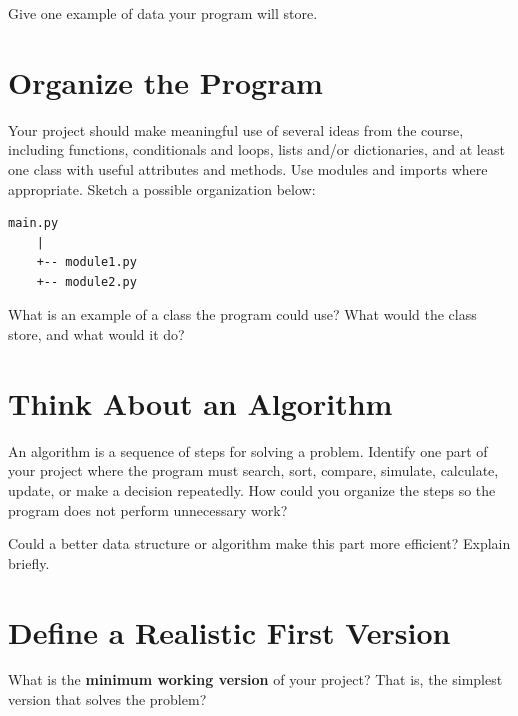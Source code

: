 \documentclass{article}
\begin{document}
Give one example of data your program will store.

\vspace{0.55cm}

\section{Organize the Program}

Your project should make meaningful use of several ideas from the course, including functions, conditionals and loops, lists and/or dictionaries, and at least one class with useful attributes and methods.  Use modules and imports where appropriate.  Sketch a possible organization below: \\ \vspace{1cm}

\begin{verbatim}
main.py
    |
    +-- module1.py
    +-- module2.py
\end{verbatim}

What is an example of a class the program could use?  What would the class store, and what would it do?

\vspace{1cm}

\section{Think About an Algorithm}

An algorithm is a sequence of steps for solving a problem. Identify one part of your project where the program must search, sort, compare, simulate, calculate, update, or make a decision repeatedly. How could you organize the steps so the program does not perform unnecessary work?

\vspace{1cm}

Could a better data structure or algorithm make this part more efficient? Explain briefly.

\vspace{1cm}

\section{Define a Realistic First Version}

What is the \textbf{minimum working version} of your project?  That is, the simplest version that solves the problem?

\vspace{0.85cm}
\end{document}
